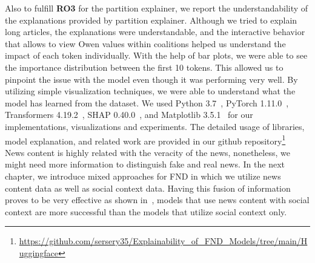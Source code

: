 Also to fulfill \textbf{RO3} for the partition explainer, we report the understandability of the explanations provided by partition explainer. Although we tried to explain long articles, the explanations were understandable, and the interactive behavior that allows to view Owen values within coalitions helped us understand the impact of each token individually. With the help of bar plots, we were able to see the importance distribution between the first 10 tokens. This allowed us to pinpoint the issue with the model even though it was performing very well. By utilizing simple visualization techniques, we were able to understand what the model has learned from the dataset. We used Python 3.7~\parencite{Python_Rossum}, PyTorch 1.11.0~\parencite{PyTorch_Paszke}, Transformers 4.19.2~\parencite{Transformers_Wolf}, SHAP 0.40.0~\parencite{AUnifiedApproach_Lundberg}, and Matplotlib 3.5.1~\parencite{Matplotlib_Hunter} for our implementations, visualizations and experiments. The detailed usage of libraries, model explanation, and related work are provided in our github repository\footnote{\url{https://github.com/sersery35/Explainability_of_FND_Models/tree/main/Huggingface}} \\
News content is highly related with the veracity of the news, nonetheless, we might need more information to distinguish fake and real news. In the next chapter, we introduce mixed approaches for FND in which we utilize news content data as well as social context data. Having this fusion of information proves to be very effective as shown in~\cite{UPFD_Dataset_Shu}, models that use news content with social context are more successful than the models that utilize social context only.\\